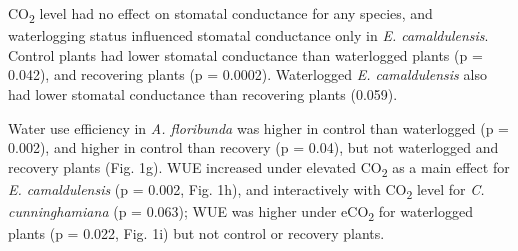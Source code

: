 \documentclass[openright,12pt,a4paper]{memoir}
\begin{document}
CO\textsubscript{2} level had no effect on stomatal conductance for any species, and waterlogging status influenced stomatal conductance only in \textit{E. camaldulensis}. Control plants had lower stomatal conductance than waterlogged plants (p = 0.042), and recovering plants (p = 0.0002). Waterlogged \textit{E. camaldulensis} also had lower stomatal conductance than recovering plants (0.059).

Water use efficiency in \textit{A. floribunda} was higher in control than waterlogged (p = 0.002), and higher in control than recovery (p = 0.04), but not waterlogged and recovery plants (Fig. 1g). WUE increased under elevated CO\textsubscript{2} as a main effect for \textit{E. camaldulensis} (p = 0.002, Fig. 1h), and interactively with CO\textsubscript{2} level for \textit{C. cunninghamiana} (p = 0.063); WUE was higher under eCO\textsubscript{2} for waterlogged plants (p = 0.022, Fig. 1i) but not control or recovery plants.
\end{document}

